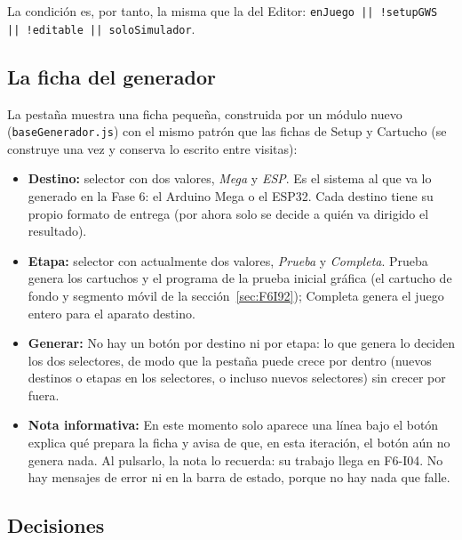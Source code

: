 La condición es, por tanto, la misma que la del Editor: \texttt{enJuego || !setupGWS || !editable || soloSimulador}.

\subsection{La ficha del generador}
\label{sec:F6I03Ficha}

La pestaña muestra una ficha pequeña, construida por un módulo nuevo (\texttt{baseGenerador.js}) con el mismo patrón que las fichas de Setup y Cartucho (se construye una vez y conserva lo escrito entre visitas):

\begin{itemize}
	\item \textbf{Destino:} selector con dos valores, \emph{Mega} y \emph{ESP}. Es el sistema al que va lo generado en la Fase 6: el Arduino Mega o el ESP32. Cada destino tiene su propio formato de entrega (por ahora solo se decide a quién va dirigido el resultado).
	\item \textbf{Etapa:} selector con actualmente dos valores, \emph{Prueba} y \emph{Completa}. Prueba genera los cartuchos y el programa de la prueba inicial gráfica (el cartucho de fondo y segmento móvil de la sección~\ref{sec:F6I92}); Completa genera el juego entero para el aparato destino.
	\item \textbf{Generar:} No hay un botón por destino ni por etapa: lo que genera lo deciden los dos selectores, de modo que la pestaña puede crece por dentro (nuevos destinos o etapas en los selectores, o incluso nuevos selectores) sin crecer por fuera.
	\item \textbf{Nota informativa:} En este momento solo aparece una línea bajo el botón explica qué prepara la ficha y avisa de que, en esta iteración, el botón aún no genera nada. Al pulsarlo, la nota lo recuerda: su trabajo llega en F6-I04. No hay mensajes de error ni en la barra de estado, porque no hay nada que falle.
\end{itemize}

\subsection{Decisiones}
\label{sec:F6I03Decisiones}

